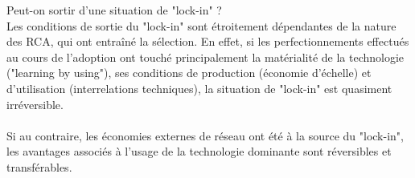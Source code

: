 \documentclass[a4paper, 10pt]{article}
\begin{document}
Peut-on sortir d'une situation de "lock-in" ?\\
Les conditions de sortie du "lock-in" sont étroitement dépendantes de la nature des RCA, qui ont entraîné la sélection.
En effet, si les perfectionnements effectués au cours de l'adoption ont touché principalement la matérialité de la technologie ("learning by using"), ses conditions de production (économie d'échelle) et d'utilisation (interrelations techniques), la situation de "lock-in" est quasiment irréversible.\\ \\
Si au contraire, les économies externes de réseau ont été à la source du "lock-in", les avantages associés à l'usage de la technologie dominante sont réversibles et transférables.\\ \\
\end{document}

